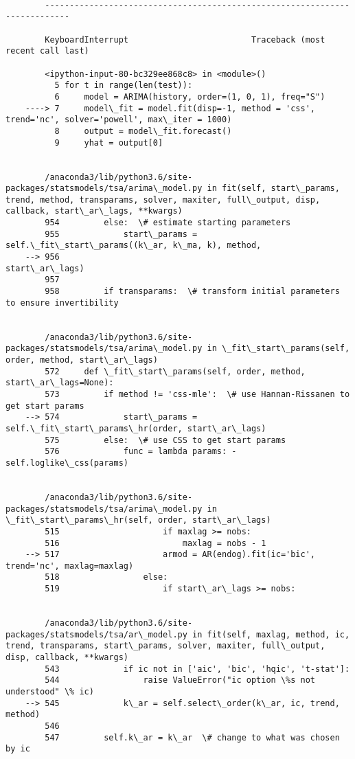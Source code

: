 \documentclass[11pt]{article}
\begin{document}
    \begin{Verbatim}[commandchars=\\\{\}]

        ---------------------------------------------------------------------------

        KeyboardInterrupt                         Traceback (most recent call last)

        <ipython-input-80-bc329ee868c8> in <module>()
          5 for t in range(len(test)):
          6     model = ARIMA(history, order=(1, 0, 1), freq="S")
    ----> 7     model\_fit = model.fit(disp=-1, method = 'css', trend='nc', solver='powell', max\_iter = 1000)
          8     output = model\_fit.forecast()
          9     yhat = output[0]


        /anaconda3/lib/python3.6/site-packages/statsmodels/tsa/arima\_model.py in fit(self, start\_params, trend, method, transparams, solver, maxiter, full\_output, disp, callback, start\_ar\_lags, **kwargs)
        954         else:  \# estimate starting parameters
        955             start\_params = self.\_fit\_start\_params((k\_ar, k\_ma, k), method,
    --> 956                                                   start\_ar\_lags)
        957 
        958         if transparams:  \# transform initial parameters to ensure invertibility


        /anaconda3/lib/python3.6/site-packages/statsmodels/tsa/arima\_model.py in \_fit\_start\_params(self, order, method, start\_ar\_lags)
        572     def \_fit\_start\_params(self, order, method, start\_ar\_lags=None):
        573         if method != 'css-mle':  \# use Hannan-Rissanen to get start params
    --> 574             start\_params = self.\_fit\_start\_params\_hr(order, start\_ar\_lags)
        575         else:  \# use CSS to get start params
        576             func = lambda params: -self.loglike\_css(params)


        /anaconda3/lib/python3.6/site-packages/statsmodels/tsa/arima\_model.py in \_fit\_start\_params\_hr(self, order, start\_ar\_lags)
        515                     if maxlag >= nobs:
        516                         maxlag = nobs - 1
    --> 517                     armod = AR(endog).fit(ic='bic', trend='nc', maxlag=maxlag)
        518                 else:
        519                     if start\_ar\_lags >= nobs:


        /anaconda3/lib/python3.6/site-packages/statsmodels/tsa/ar\_model.py in fit(self, maxlag, method, ic, trend, transparams, start\_params, solver, maxiter, full\_output, disp, callback, **kwargs)
        543             if ic not in ['aic', 'bic', 'hqic', 't-stat']:
        544                 raise ValueError("ic option \%s not understood" \% ic)
    --> 545             k\_ar = self.select\_order(k\_ar, ic, trend, method)
        546 
        547         self.k\_ar = k\_ar  \# change to what was chosen by ic



\end{Verbatim}
\end{document}
